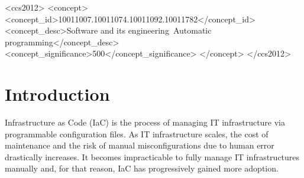 \documentclass[sigconf,nonacm]{acmart}
\begin{document}
\begin{CCSXML}
<ccs2012>
   <concept>
        <concept_id>10011007.10011074.10011092.10011782</concept_id>
       <concept_desc>Software and its engineering~Automatic programming</concept_desc>
       <concept_significance>500</concept_significance>
    </concept>
 </ccs2012>
\end{CCSXML}




\maketitle

\section{Introduction}

Infrastructure as Code (IaC) is the process of managing IT infrastructure via programmable configuration files. As IT infrastructure scales, the cost of maintenance and the risk of manual misconfigurations due to human error drastically increases. 
It becomes impracticable to fully manage IT infrastructures manually and, for that reason, IaC has progressively gained more adoption. 
\end{document}
